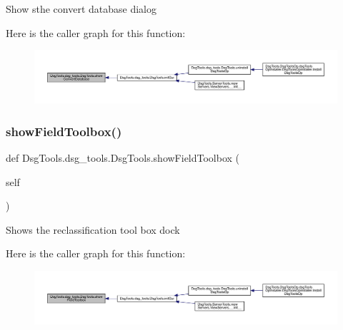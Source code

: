 \begin{DoxyVerb}Show sthe convert database dialog
\end{DoxyVerb}
 Here is the caller graph for this function\+:
\nopagebreak
\begin{figure}[H]
\begin{center}
\leavevmode
\includegraphics[width=350pt]{class_dsg_tools_1_1dsg__tools_1_1_dsg_tools_a81bc3b864b7a3db7781403ecda33b91d_icgraph}
\end{center}
\end{figure}
\mbox{\label{class_dsg_tools_1_1dsg__tools_1_1_dsg_tools_a3638a2d1b3ab271a70989d2586af9d41}} 
\subsubsection{\texorpdfstring{show\+Field\+Toolbox()}{showFieldToolbox()}}
{\footnotesize\ttfamily def Dsg\+Tools.\+dsg\+\_\+tools.\+Dsg\+Tools.\+show\+Field\+Toolbox (\begin{DoxyParamCaption}\item[{}]{self }\end{DoxyParamCaption})}

\begin{DoxyVerb}Shows the reclassification tool box dock
\end{DoxyVerb}
 Here is the caller graph for this function\+:
\nopagebreak
\begin{figure}[H]
\begin{center}
\leavevmode
\includegraphics[width=350pt]{class_dsg_tools_1_1dsg__tools_1_1_dsg_tools_a3638a2d1b3ab271a70989d2586af9d41_icgraph}
\end{center}
\end{figure}
\mbox{\label{class_dsg_tools_1_1dsg__tools_1_1_dsg_tools_a11b6c84296f2542f676586db2125d2d7}} 
